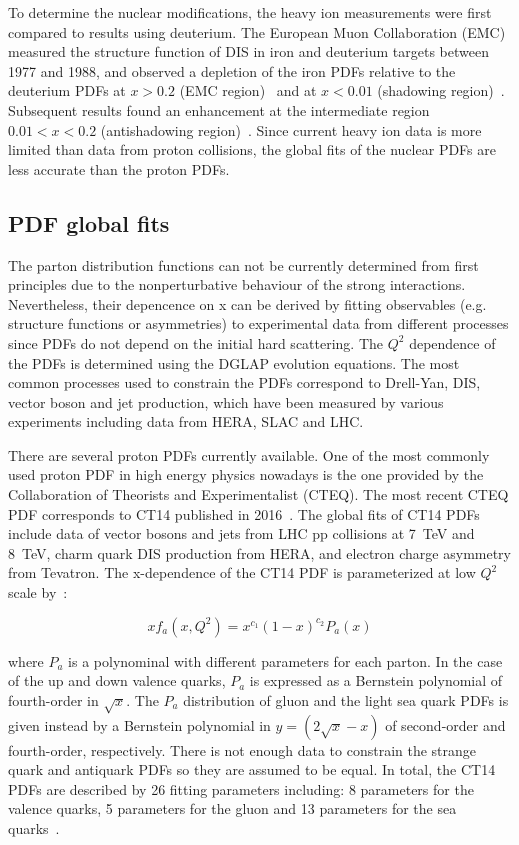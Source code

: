 To determine the nuclear modifications, the heavy ion measurements were first compared to results using deuterium. The European Muon Collaboration (EMC) measured the structure function of DIS in iron and deuterium targets between 1977 and 1988, and observed a depletion of the iron PDFs relative to the deuterium PDFs at $x>0.2$ (EMC region)~\cite{EMCStrucFunc_1} and at $x<0.01$ (shadowing region)~\cite{EMCStrucFunc_2}. Subsequent results found an enhancement at the intermediate region $0.01 < x < 0.2$ (antishadowing region)~\cite{NMCStrucFunc}. Since current heavy ion data is more limited than data from proton collisions, the global fits of the nuclear PDFs are less accurate than the proton PDFs.


\subsection{PDF global fits}

The parton distribution functions can not be currently determined from first principles due to the nonperturbative behaviour of the strong interactions. Nevertheless, their depencence on x can be derived by fitting observables (e.g. structure functions or asymmetries) to experimental data from different processes since PDFs do not depend on the initial hard scattering. The $Q^{2}$ dependence of the PDFs is determined using the DGLAP evolution equations. The most common processes used to constrain the PDFs correspond to Drell-Yan, DIS, vector boson and jet production, which have been measured by various experiments including data from HERA, SLAC and LHC.

There are several proton PDFs currently available. One of the most commonly used proton PDF in high energy physics nowadays is the one provided by the Collaboration of Theorists and Experimentalist (CTEQ). The most recent CTEQ PDF corresponds to CT14 published in 2016~\cite{CT14}. The global fits of CT14 PDFs include data of vector bosons and jets from LHC pp collisions at \SI{7}{\TeV} and \SI{8}{\TeV}, charm quark DIS production from HERA, and electron charge asymmetry from Tevatron. The x-dependence of the CT14 PDF is parameterized at low $Q^{2}$ scale by~\cite{CT14}:

\begin{equation}
xf_{a}\left(x, Q^{2}\right) = x^{c_{1}}\left(1-x\right)^{c_{2}}{P_{a}\left(x\right)}
\end{equation}

where $P_{a}$ is a polynominal with different parameters for each parton. In the case of the up and down valence quarks, $P_{a}$ is expressed as a Bernstein polynomial of fourth-order in $\sqrt{x}$. The $P_{a}$ distribution of gluon and the light sea quark PDFs is given instead by a Bernstein polynomial in $y=\left(2\sqrt{x}-x\right)$ of second-order and fourth-order, respectively. There is not enough data to constrain the strange quark and antiquark PDFs so they are assumed to be equal. In total, the CT14 PDFs are described by 26 fitting parameters including: 8 parameters for the valence quarks, 5 parameters for the gluon and 13 parameters for the sea quarks~\cite{CT14}.

